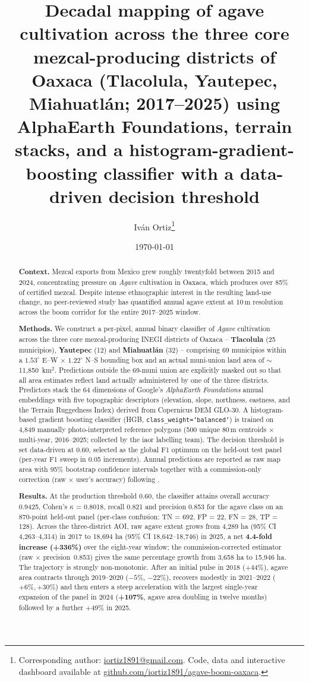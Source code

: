 \documentclass[10pt,a4paper]{article}
\title{\textbf{Decadal mapping of agave cultivation across the three
core mezcal-producing districts of Oaxaca (Tlacolula, Yautepec,
Miahuatlán; 2017--2025) using AlphaEarth Foundations, terrain
stacks, and a histogram-gradient-boosting classifier with a
data-driven decision threshold}}
\author{Iv\'an Ortiz\thanks{Corresponding author:
\href{mailto:iortiz1891@gmail.com}{iortiz1891@gmail.com}.
Code, data and interactive dashboard available at
\href{https://github.com/iortiz1891/agave-boom-oaxaca}{github.com/iortiz1891/agave-boom-oaxaca}.}}
\date{\today}
\begin{document}
\maketitle

\begin{abstract}
\noindent\textbf{Context.} Mezcal exports from Mexico grew roughly twentyfold
between 2015 and 2024, concentrating pressure on \textit{Agave} cultivation
in Oaxaca, which produces over 85\% of certified mezcal. Despite intense
ethnographic interest in the resulting land-use change, no peer-reviewed
study has quantified annual agave extent at 10\,m resolution across the
boom corridor for the entire 2017--2025 window.

\noindent\textbf{Methods.} We construct a per-pixel, annual binary
classifier of \textit{Agave} cultivation across the three core
mezcal-producing INEGI districts of Oaxaca -- \textbf{Tlacolula}
(25 municipios), \textbf{Yautepec} (12) and \textbf{Miahuatlán}
(32) -- comprising 69 municipios within a $1.53^{\circ}$ E--W
$\times$ $1.22^{\circ}$ N--S bounding box and an actual muni-union
land area of $\sim$11{,}850~km$^2$. Predictions outside the 69-muni
union are explicitly masked out so that all area estimates reflect
land actually administered by one of the three districts.
Predictors stack the 64 dimensions of Google's
\textit{AlphaEarth Foundations} annual embeddings with five
topographic descriptors (elevation, slope, northness, eastness, and
the Terrain Ruggedness Index) derived from Copernicus DEM GLO-30. A
histogram-based gradient boosting classifier (HGB,
\texttt{class\_weight='balanced'}) is trained on 4{,}849 manually
photo-interpreted reference polygons (500 unique 80\,m centroids
$\times$ multi-year, 2016--2025; collected by the iaor labelling
team). The decision threshold is set data-driven at 0.60, selected
as the global F1 optimum on the held-out test panel (per-year F1
sweep in 0.05 increments). Annual predictions are reported as raw
map area with 95\% bootstrap confidence intervals together with a
commission-only correction (raw $\times$ user's accuracy) following
\citet{olofsson2014good}.

\noindent\textbf{Results.} At the production threshold 0.60, the
classifier attains overall accuracy 0.9425, Cohen's $\kappa$ =
0.8018, recall 0.821 and precision 0.853 for the agave class on an
870-point held-out panel (per-class confusion: TN = 692, FP = 22,
FN = 28, TP = 128). Across the three-district AOI, raw agave
extent grows from 4{,}289 ha (95\% CI 4{,}263--4{,}314) in 2017
to 18{,}694 ha (95\% CI 18{,}642--18{,}746) in 2025, a net
\textbf{4.4-fold increase (+336\%)} over the eight-year window;
the commission-corrected estimator (raw $\times$ precision~0.853)
gives the same percentage growth from 3{,}658 ha to 15{,}946 ha.
The trajectory is strongly non-monotonic. After an initial pulse
in 2018 (+44\%), agave area contracts through 2019--2020
($-5\%$, $-22\%$), recovers modestly in 2021--2022 ($+6\%, +30\%$)
and then enters a steep acceleration with the largest single-year
expansion of the panel in 2024 (\textbf{+107\%}, agave area
doubling in twelve months) followed by a further +49\% in 2025.


\end{abstract}
\end{document}
